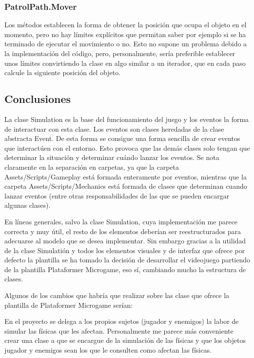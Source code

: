 \subsubsection{PatrolPath.Mover}
Los métodos establecen la forma de obtener la posición que ocupa el objeto en el momento, pero no hay límites explícitos que permitan saber por ejemplo si se ha terminado de ejecutar el movimiento o no. Esto no supone un problema debido a la implementación del código, pero, personalmente, sería preferible establecer unos límites convirtiendo la clase en algo similar a un iterador, que en cada paso calcule la siguiente posición del objeto.

\subsection{Conclusiones}
La clase Simulation es la base del funcionamiento del juego y los eventos la forma de interactuar con esta clase. Los eventos son clases heredadas de la clase abstracta Event. De esta forma se consigue una forma sencilla de crear eventos que interactúen con el entorno. Esto provoca que las demás clases solo tengan que determinar la situación y determinar cuándo lanzar los eventos. Se nota claramente en la separación en carpetas, ya que la carpeta Assets/Scripts/Gameplay está formada enteramente por eventos, mientras que la carpeta Assets/Scripts/Mechanics está formada de clases que determinan cuando lanzar eventos (entre otras responsabilidades de las que se pueden encargar algunas clases).

En líneas generales, salvo la clase Simulation, cuya implementación me parece correcta y muy útil, el resto de los elementos deberían ser reestructurados para adecuarse al modelo que se desea implementar. Sin embargo gracias a la utilidad de la clase Simulatión y todos los elementos visuales y de interfaz que ofrece por defecto la plantilla se ha tomado la decisión de desarrollar el videojuego partiendo de la plantilla Plataformer Microgame, eso sí, cambiando mucho la estructura de clases.

Algunos de los cambios que habría que realizar sobre las clase que ofrece la plantilla de Plataformer Microgame serían:

En el proyecto se delega a los propios sujetos (jugador y enemigos) la labor de simular las físicas que les afectan. Personalmente me parece más conveniente crear una clase a que se encargue de la simulación de las físicas y que los objetos jugador y enemigos sean los que le consulten como afectan las físicas. 

